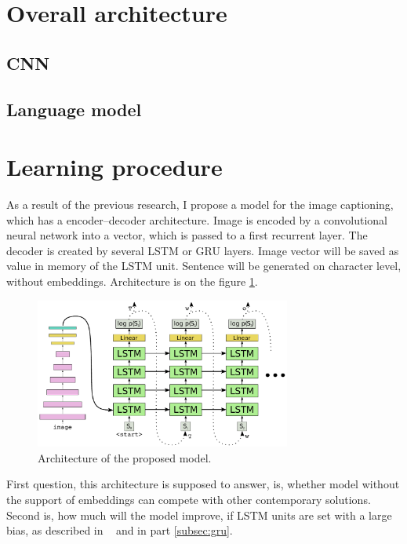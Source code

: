 \section{Overall architecture}
\subsection{CNN}
\subsection{Language model}
\section{Learning procedure}
As a result of the previous research, I propose a model for the image captioning, which has a encoder--decoder architecture. Image is encoded by a convolutional neural network into a vector, which is passed to a first recurrent layer. The decoder is created by several LSTM or GRU layers. Image vector will be saved as value in memory of the LSTM unit. Sentence will be generated on character level, without embeddings. Architecture is on the figure \ref{fig:proposedModel}.

\begin{figure}[!t]
	\centering
	\includegraphics[width=0.75\textwidth]{./fig/proposed-model.pdf}
	\caption{Architecture of the proposed model.
		\label{fig:proposedModel}}
\end{figure}

First question, this architecture is supposed to answer, is, whether model without the support of embeddings can compete with other contemporary solutions. Second is, how much will the model improve, if LSTM units are set with a large bias, as described in ~\cite{DBLP:conf/icml/JozefowiczZS15} and in part \ref{subsec:gru}.


